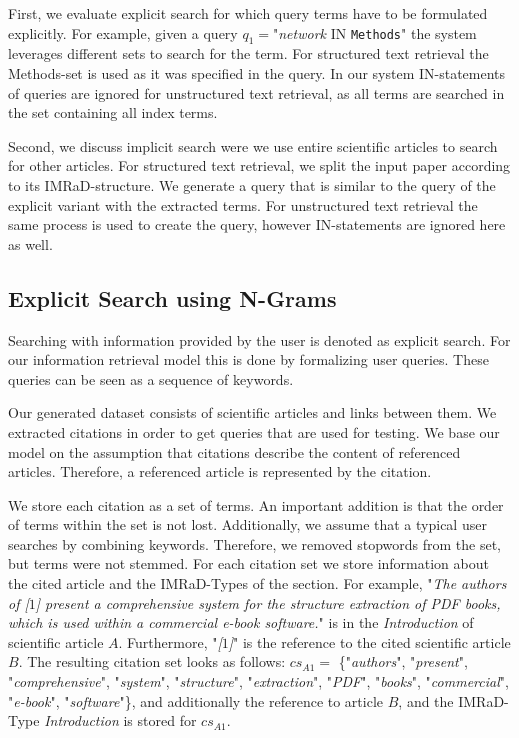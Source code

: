 First, we evaluate explicit search for which query terms have to be formulated explicitly. For example, given a query $q_1=$"\textit{network} IN \texttt{Methods}" the system leverages different sets to search for the term. For structured text retrieval the Methods-set is used as it was specified in the query. In our system IN-statements of queries are ignored for unstructured text retrieval, as all terms are searched in the set containing all index terms.

Second, we discuss implicit search were we use entire scientific articles to search for other articles. For structured text retrieval, we split the input paper according to its IMRaD-structure. We generate a query that is similar to the query of the explicit variant with the extracted terms. For unstructured text retrieval the same process is used to create the query, however IN-statements are ignored here as well.


\subsection{Explicit Search using N-Grams}

Searching with information provided by the user is denoted as explicit search. For our information retrieval model this is done by formalizing user queries. These queries can be seen as a sequence of keywords.

Our generated dataset consists of scientific articles and links between them. We extracted citations in order to get queries that are used for testing. We base our model on the assumption that citations describe the content of referenced articles. Therefore, a referenced article is represented by the citation.

We store each citation as a set of terms. An important addition is that the order of terms within the set is not lost. Additionally, we assume that a typical user searches by combining keywords. Therefore, we removed stopwords from the set, but terms were not stemmed. For each citation set we store information about the cited article and the IMRaD-Types of the section. For example, "\textit{The authors of [$1$] present a comprehensive system for the structure extraction of PDF books, which is used within a commercial e-book software.}" is in the \textit{Introduction} of scientific article $A$. Furthermore, "\textit{[$1$]}" is the reference to the cited scientific article $B$. The resulting citation set looks as follows: $cs_{A1} =$ \{"\textit{authors}", "\textit{present}", "\textit{comprehensive}", "\textit{system}", "\textit{structure}", "\textit{extraction}", "\textit{PDF}", "\textit{books}", "\textit{commercial}", "\textit{e-book}", "\textit{software}"\}, and additionally the reference to article $B$, and the IMRaD-Type \textit{Introduction} is stored for $cs_{A1}$.

